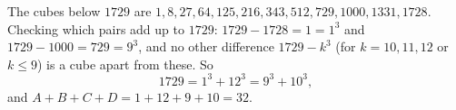 The cubes below $1729$ are $1,8,27,64,125,216,343,512,729,1000,1331,1728$. Checking which pairs add up to $1729$: $1729-1728=1=1^3$ and $1729-1000=729=9^3$, and no other difference $1729-k^3$ (for $k=10,11,12$ or $k\le9$) is a cube apart from these. So
\[
1729=1^3+12^3=9^3+10^3,
\]
and $A+B+C+D=1+12+9+10=\boxed{32}$.
